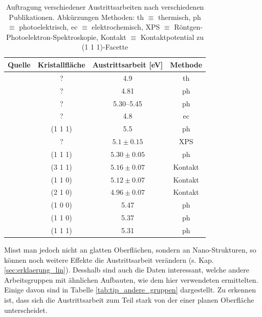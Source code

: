 \documentclass[bachelor,       %
               twoside,        %
               BCOR10mm,       %
               english,ngerman, %
               ]{GAUBM}
\begin{document}
\begin{table}[h!]
\centering
\begin{tabular}{|l|c|c|c|}
\hline 
Quelle & Kristallfläche & Austrittsarbeit [\unit{eV}] & Methode \\ 
\hline\hline
\cite{fowler_1931} & ? 			& 4.9 				& th \\\hline
\cite{dubridge_further_1932} & ? 	& 4.81 			& ph \\\hline

\cite{sachtler_work_1966} & ? 	& \numrange{5.30}{5.45} & ph \\\hline

\cite{trasatti_operative_1974} & ? 	& 4.8 		& ec \\\hline
\cite{pescia_spin_1982} & (1 1 1) 	& 5.5 		& ph \\\hline
\cite{koetz_1986} & ? 				& $5.1\pm0.15$ 		& XPS \\\hline
\cite{lecoeur_1990}	& (1 1 1) 		& $5.30\pm0.05$ 	& ph \\
					& (3 1 1) 		& $5.16\pm0.07$ 	& Kontakt \\
					& (1 1 0) 		& $5.12\pm0.07$ 	& Kontakt \\
					& (2 1 0) 		& $4.96\pm0.07$ 	& Kontakt \\\hline
\cite{crc}		&(1 0 0) 			& 5.47 				& ph \\
 				&(1 1 0) 			& 5.37 				& ph \\
				&(1 1 1) 			& 5.31 				& ph \\\hline
\end{tabular} 
\caption{Auftragung verschiedener Austrittsarbeiten nach verschiedenen Publikationen. Abkürzungen Methoden: th $\equiv$ thermisch, ph $\equiv$ photoelektrisch, ec $\equiv$ elektrochemisch, XPS $\equiv$ Röntgen-Photoelektron-Spektroskopie, Kontakt $\equiv$ Kontaktpotential zu (1 1 1)-Facette}
\label{tab:austrittsarbeit}
\end{table}

Misst man jedoch nicht an glatten Oberflächen, sondern an Nano-Strukturen, so können noch weitere Effekte die Austrittsarbeit verändern (s. Kap. \ref{sec:erklaerung_lin}).
Desshalb sind auch die Daten interessant, welche andere Arbeitsgruppen mit ähnlichen Aufbauten, wie dem hier verwendeten ermittelten.
Einige davon sind in Tabelle \ref{tab:tip_andere_gruppen} dargestellt.
Zu erkennen ist, dass sich die Austrittsarbeit zum Teil stark von der einer planen Oberfläche unterscheidet.
\end{document}
